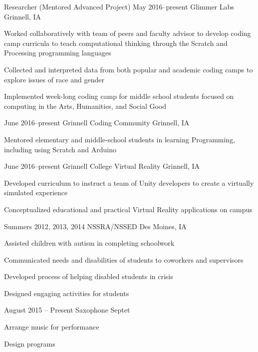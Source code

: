 \documentclass{article}
\begin{document}
\address{1115 8th Avenue}

\cvheader


\begin{cventries}

   \cventry
     {Researcher (Mentored Advanced Project)}
     {May 2016--present}
     {Glimmer Labs}
     {Grinnell, IA}
     {
      \item Worked collaboratively with team of peers and faculty advisor to develop coding camp curricula to teach computational thinking through the Scratch and Processing programming languages 
      \item Collected and interpreted data from both popular and academic coding camps to explore issues of race and gender 
      \item Implemented week-long coding camp for middle school students focused on computing in the Arts, Humanities, and Social Good
     }

\end{cventries}


\begin{cventries}

    {June 2016--present}
    {Grinnell Coding Community}
    {Grinnell, IA}
    {
    \item Mentored elementary and middle-school students in learning
      Programming, including using Scratch and Arduino
    }

    {June 2016--present}
    {Grinnell College Virtual Reality}
    {Grinnell, IA}
    {
      \item Developed curriculum to instruct a team of Unity developers
        to create a virtually simulated experience
      \item Conceptualized educational and practical Virtual Reality
        applications on campus
    }

       {Summers 2012, 2013, 2014}
       {NSSRA/NSSED}
       {Des Moines, IA}
       {
         \item Assisted children with autism in completing schoolwork
         \item Communicated needs and disabilities of students to coworkers and supervisors
         \item Developed process of helping disabled students in crisis 
         \item Designed engaging activities for students
       }

       {August 2015 – Present}
       {Saxophone Septet}
       {}
       {
         \item Arrange music for performance
         \item Design programs       
       }

\end{cventries}
\end{document}
